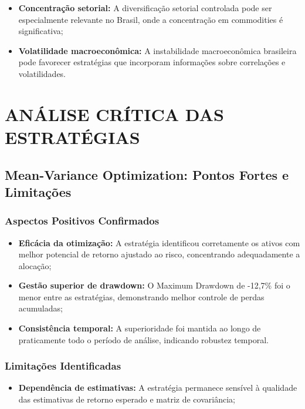 \begin{itemize}
\begin{itemize}
\begin{itemize}
\begin{itemize}
\begin{itemize}
\begin{itemize}
    \item \textbf{Concentração setorial:} A diversificação setorial controlada pode ser especialmente relevante no Brasil, onde a concentração em commodities é significativa;
    
    \item \textbf{Volatilidade macroeconômica:} A instabilidade macroeconômica brasileira pode favorecer estratégias que incorporam informações sobre correlações e volatilidades.
\end{itemize}

\section{ANÁLISE CRÍTICA DAS ESTRATÉGIAS}

\subsection{Mean-Variance Optimization: Pontos Fortes e Limitações}

\subsubsection{Aspectos Positivos Confirmados}

\begin{itemize}
    \item \textbf{Eficácia da otimização:} A estratégia identificou corretamente os ativos com melhor potencial de retorno ajustado ao risco, concentrando adequadamente a alocação;
    
    \item \textbf{Gestão superior de drawdown:} O Maximum Drawdown de -12,7\% foi o menor entre as estratégias, demonstrando melhor controle de perdas acumuladas;
    
    \item \textbf{Consistência temporal:} A superioridade foi mantida ao longo de praticamente todo o período de análise, indicando robustez temporal.
\end{itemize}

\subsubsection{Limitações Identificadas}

\begin{itemize}
    \item \textbf{Dependência de estimativas:} A estratégia permanece sensível à qualidade das estimativas de retorno esperado e matriz de covariância;
    

\end{itemize}
\end{itemize}
\end{itemize}
\end{itemize}
\end{itemize}
\end{itemize}
